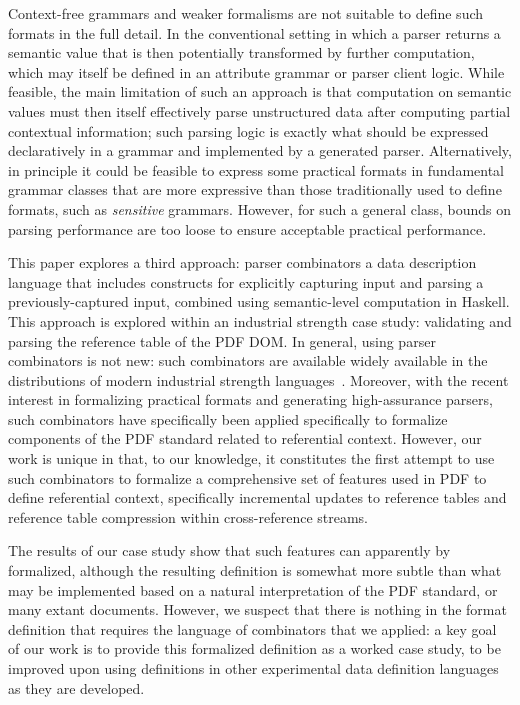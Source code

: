 Context-free grammars and weaker formalisms are not suitable to define
such formats in the full detail.
%
In the conventional setting in which a parser returns a semantic value
that is then potentially transformed by further computation, which may
itself be defined in an attribute grammar or parser client logic.
%
While feasible, the main limitation of such an approach is that
computation on semantic values must then itself effectively parse
unstructured data after computing partial contextual information;
%
such parsing logic is exactly what should be expressed declaratively
in a grammar and implemented by a generated parser.
%
Alternatively, in principle it could be feasible to express some
practical formats in fundamental grammar classes that are more
expressive than those traditionally used to define formats, such as
\emph{sensitive} grammars.
%
However, for such a general class, bounds on parsing performance are
too loose to ensure acceptable practical performance.

This paper explores a third approach: parser combinators a data
description language that includes constructs for explicitly capturing
input and parsing a previously-captured input, combined using
semantic-level computation in Haskell.
%
This approach is explored within an industrial strength case study:
validating and parsing the reference table of the PDF DOM.
%
In general, using parser combinators is not new: such combinators are
available widely available in the distributions of modern industrial
strength languages~.
%
Moreover, with the recent interest in formalizing practical formats
and generating high-assurance parsers, such combinators have
specifically been applied specifically to formalize components of the
PDF standard related to referential context.
%
However, our work is unique in that, to our knowledge, it constitutes
the first attempt to use such combinators to formalize a comprehensive
set of features used in PDF to define referential context,
specifically incremental updates to reference tables and reference
table compression within cross-reference streams.

The results of our case study show that such features can apparently
by formalized, although the resulting definition is somewhat more
subtle than what may be implemented based on a natural interpretation
of the PDF standard, or many extant documents.
%
However, we suspect that there is nothing in the format definition
that requires the language of combinators that we applied: a key goal
of our work is to provide this formalized definition as a worked case
study, to be improved upon using definitions in other experimental
data definition languages as they are developed.

